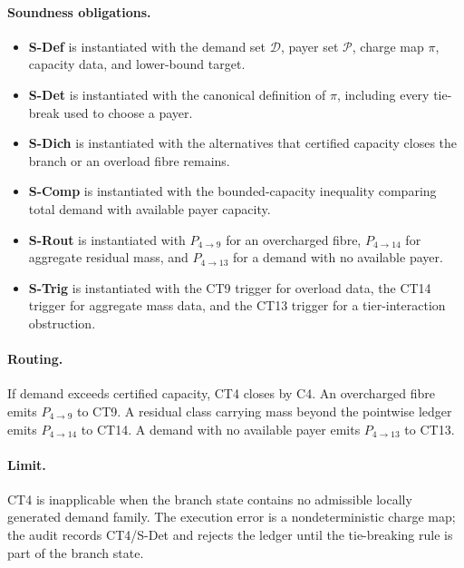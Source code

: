 \documentclass[
  11pt,
]{article}
\providecommand{\tightlist}{%
  \setlength{\itemsep}{0pt}\setlength{\parskip}{0pt}}
\theoremstyle{definition}
\newcommand{\ctpar}[1]{\paragraph{#1.}}
\begin{document}
\ctpar{Soundness obligations}
\begin{itemize}
\tightlist
\item \textbf{S-Def} is instantiated with the demand set \(\mathcal D\), payer set \(\mathcal P\), charge map \(\pi\), capacity data, and lower-bound target.
\item \textbf{S-Det} is instantiated with the canonical definition of \(\pi\), including every tie-break used to choose a payer.
\item \textbf{S-Dich} is instantiated with the alternatives that certified capacity closes the branch or an overload fibre remains.
\item \textbf{S-Comp} is instantiated with the bounded-capacity inequality comparing total demand with available payer capacity.
\item \textbf{S-Rout} is instantiated with \(P_{4\to9}\) for an overcharged fibre, \(P_{4\to14}\) for aggregate residual mass, and \(P_{4\to13}\) for a demand with no available payer.
\item \textbf{S-Trig} is instantiated with the CT9 trigger for overload data, the CT14 trigger for aggregate mass data, and the CT13 trigger for a tier-interaction obstruction.
\end{itemize}

\ctpar{Routing}
If demand exceeds certified capacity, CT4 closes by C4.  An overcharged
fibre emits \(P_{4\to9}\) to CT9.  A residual class carrying mass beyond
the pointwise ledger emits \(P_{4\to14}\) to CT14.  A demand with no
available payer emits \(P_{4\to13}\) to CT13.

\ctpar{Limit}
CT4 is inapplicable when the branch state contains no admissible locally
generated demand family. The
execution error is a nondeterministic charge map; the audit records
CT4/S-Det and rejects the ledger until the tie-breaking rule is part of
the branch state.
\end{document}
